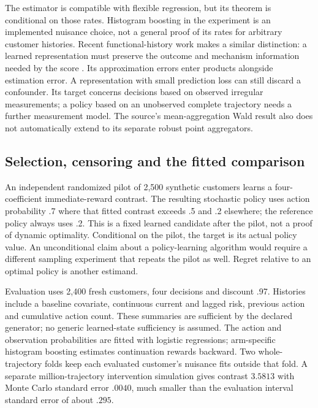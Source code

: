 The estimator is compatible with flexible regression, but its theorem is
conditional on those rates. Histogram boosting in the experiment is an
implemented nuisance choice, not a general proof of its rates for arbitrary
customer histories. Recent functional-history work makes a similar
distinction: a learned representation must preserve the outcome and mechanism
information needed by the score \citep[Definition 1, Assumptions 5--9,
Theorems 3--4]{ran2026}. Its approximation errors enter products alongside
estimation error. A representation with small prediction loss can still
discard a confounder. Its target concerns decisions based on observed
irregular measurements; a policy based on an unobserved complete trajectory
needs a further measurement model. The source's mean-aggregation Wald result
also does not automatically extend to its separate robust point aggregators.

\subsection{Selection, censoring and the fitted comparison}
An independent randomized pilot of 2,500 synthetic customers learns a
four-coefficient immediate-reward contrast. The resulting stochastic policy
uses action probability .7 where that fitted contrast exceeds .5 and .2
elsewhere; the reference policy always uses .2. This is a fixed learned
candidate after the pilot, not a proof of dynamic optimality. Conditional
on the pilot, the target is its actual policy value. An unconditional claim
about a policy-learning algorithm would require a different sampling
experiment that repeats the pilot as well. Regret relative to an optimal
policy is another estimand.

Evaluation uses 2,400 fresh customers, four decisions and discount .97.
Histories include a baseline covariate, continuous current and lagged risk,
previous action and cumulative action count. These summaries are sufficient
by the declared generator; no generic learned-state sufficiency is assumed.
The action and observation probabilities are fitted with logistic regressions;
arm-specific histogram boosting estimates continuation rewards backward.
Two whole-trajectory folds keep each evaluated customer's nuisance fits
outside that fold. A separate million-trajectory intervention simulation
gives contrast $3.5813$ with Monte Carlo standard error $.0040$, much smaller
than the evaluation interval standard error of about $.295$.

